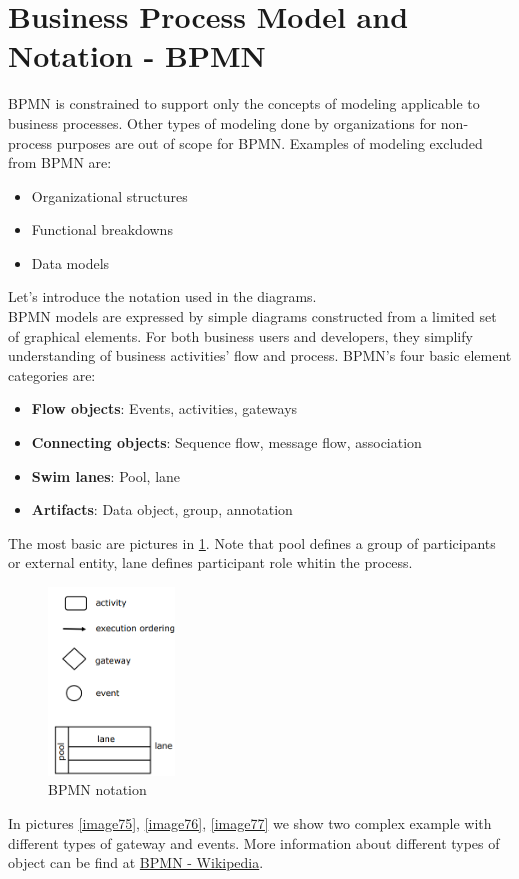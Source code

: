 \documentclass[10pt,a4paper]{report}
\begin{document}
\section{Business Process Model and Notation - BPMN}
BPMN is constrained to support only the concepts of modeling applicable to business processes. Other types of modeling done by organizations for non-process purposes are out of scope for BPMN. Examples of modeling excluded from BPMN are:
\begin{itemize}
	\item Organizational structures
	\item Functional breakdowns
	\item Data models
\end{itemize}
Let's introduce the notation used in the diagrams.\\
BPMN models are expressed by simple diagrams constructed from a limited set of graphical elements. For both business users and developers, they simplify understanding of business activities' flow and process. BPMN's four basic element categories are:
\begin{itemize}
	\item \textbf{Flow objects}: Events, activities, gateways
	\item \textbf{Connecting objects}: Sequence flow, message flow, association
	\item \textbf{Swim lanes}: Pool, lane
	\item \textbf{Artifacts}: Data object, group, annotation
\end{itemize}
The most basic are pictures in \ref{image74}. Note that pool defines a group of participants or external entity, lane defines participant role whitin the process.
\begin{figure}[h]
	\centering
	\includegraphics[width=0.3\textwidth]{image74}
	\caption{BPMN notation }
	\label{image74}
\end{figure}
In pictures \ref{image75}, \ref{image76}, \ref{image77} we show two complex example with different types of gateway and events. More information about different types of object can be find at \href{https://en.wikipedia.org/wiki/Business_Process_Model_and_Notation}{BPMN - Wikipedia}.
\end{document}

